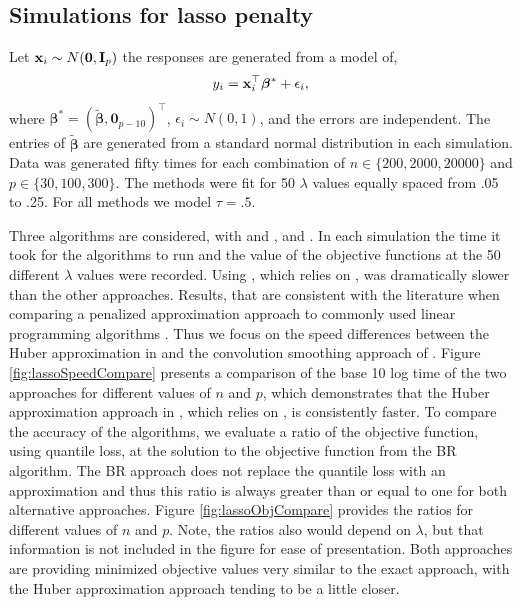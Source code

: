 \subsection{Simulations for lasso penalty}\label{simulations-for-lasso-penalty}

Let \({\bf x}_i \sim N({\bf 0}, {\bf I}_p)\) the responses are generated from a model of,\\
\begin{equation}
y_i = {\bf x}_i^\top \bm \beta^* + \epsilon_i,
\label{eq:dgp}
\end{equation}
where \(\bm \beta^*=(\tilde{\bm \beta},\mathbf{0}_{p-10})^\top\), \(\epsilon_i \sim N(0,1)\), and the errors are independent. The entries of \(\tilde{\bm \beta}\) are generated from a standard normal distribution in each simulation. Data was generated fifty times for each combination of \(n \in \{200,2000,20000\}\) and \(p \in \{30,100,300\}\). The methods were fit for 50 \(\lambda\) values equally spaced from .05 to .25. For all methods we model \(\tau=.5\).

Three algorithms are considered,  with  and , and . In each simulation the time it took for the algorithms to run and the value of the objective functions at the 50 different \(\lambda\) values were recorded. Using , which relies on , was dramatically slower than the other approaches. Results, that are consistent with the literature when comparing a penalized approximation approach to commonly used linear programming algorithms \citep{huber_cd, highdConv}. Thus we focus on the speed differences between the Huber approximation in  and the convolution smoothing approach of . Figure \ref{fig:lassoSpeedCompare} presents a comparison of the base 10 log time of the two approaches for different values of \(n\) and \(p\), which demonstrates that the Huber approximation approach in , which relies on , is consistently faster. To compare the accuracy of the algorithms, we evaluate a ratio of the objective function, using quantile loss, at the solution to the objective function from the BR algorithm. The BR approach does not replace the quantile loss with an approximation and thus this ratio is always greater than or equal to one for both alternative approaches. Figure \ref{fig:lassoObjCompare} provides the ratios for different values of \(n\) and \(p\). Note, the ratios also would depend on \(\lambda\), but that information is not included in the figure for ease of presentation. Both approaches are providing minimized objective values very similar to the exact approach, with the Huber approximation approach tending to be a little closer.


